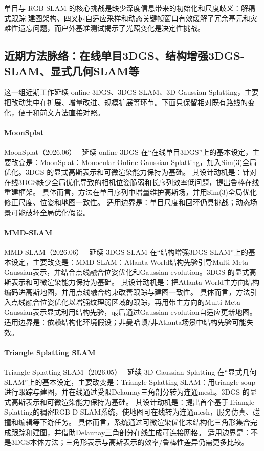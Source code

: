 \begin{takeaway}
单目与 RGB SLAM 的核心挑战是缺少深度信息带来的初始化和尺度歧义：解耦式跟踪-建图架构、四叉树自适应采样和动态关键帧窗口有效缓解了冗余基元和灾难性遗忘问题，而户外基准测试揭示了光照变化是决定性挑战。
\end{takeaway}


\subsection{近期方法脉络：在线单目3DGS、结构增强3DGS-SLAM、显式几何SLAM等}

这一组近期工作延续 online 3DGS、3DGS-SLAM、3D Gaussian Splatting，主要把改动集中在扩展、增量改进、规模扩展等环节。下面只保留相对既有路线的变化，便于和前文方法直接对照。

\paragraph{MoonSplat}
MoonSplat（2026.06）~\cite{2606_17935} 延续 online 3DGS 在“在线单目3DGS”上的基本设定，主要改变是：MoonSplat：Monocular Online Gaussian Splatting，加入Sim(3)全局优化。3DGS 的显式高斯表示和可微渲染能力保持为基础。
其设计动机是：针对在线3DGS缺少全局优化导致的相机位姿脆弱和长序列效率低问题，提出鲁棒在线重建框架。
具体而言，方法在单目序列中增量维护高斯场，并用Sim(3)全局优化修正尺度、位姿和地图一致性。
适用边界是：单目尺度和回环仍具挑战；动态场景可能破坏全局优化假设。

\paragraph{MMD-SLAM}
MMD-SLAM（2026.06）~\cite{2606_19874} 延续 3DGS-SLAM 在“结构增强3DGS-SLAM”上的基本设定，主要改变是：MMD-SLAM：Atlanta World结构先验引导Multi-Meta Gaussian表示，并结合点线融合位姿优化和Gaussian evolution。3DGS 的显式高斯表示和可微渲染能力保持为基础。
其设计动机是：把Atlanta World主方向结构编码进高斯地图，并用点线融合约束改善跟踪与建图一致性。
具体而言，方法引入点线融合位姿优化以增强纹理弱区域的跟踪，再用带主方向的Multi-Meta Gaussian表示显式利用结构先验，最后通过Gaussian evolution自适应更新地图。
适用边界是：依赖结构化环境假设；非曼哈顿/非Atlanta场景中结构先验可能失效。

\paragraph{Triangle Splatting SLAM}
Triangle Splatting SLAM（2026.05）~\cite{2605_31419} 延续 3D Gaussian Splatting 在“显式几何SLAM”上的基本设定，主要改变是：Triangle Splatting SLAM：用triangle soup进行跟踪与建图，并在线通过受限Delaunay三角剖分转为连通mesh。3DGS 的显式高斯表示和可微渲染能力保持为基础。
其设计动机是：提出首个基于Triangle Splatting的稠密RGB-D SLAM系统，使地图可在线转为连通mesh，服务仿真、碰撞和编辑等下游任务。
具体而言，系统通过可微渲染优化未结构化三角形集合完成跟踪和建图，并借助Delaunay三角剖分在线生成可连接网格。
适用边界是：不是3DGS本体方法；三角形表示与高斯表示的效率/鲁棒性差异仍需更多比较。

